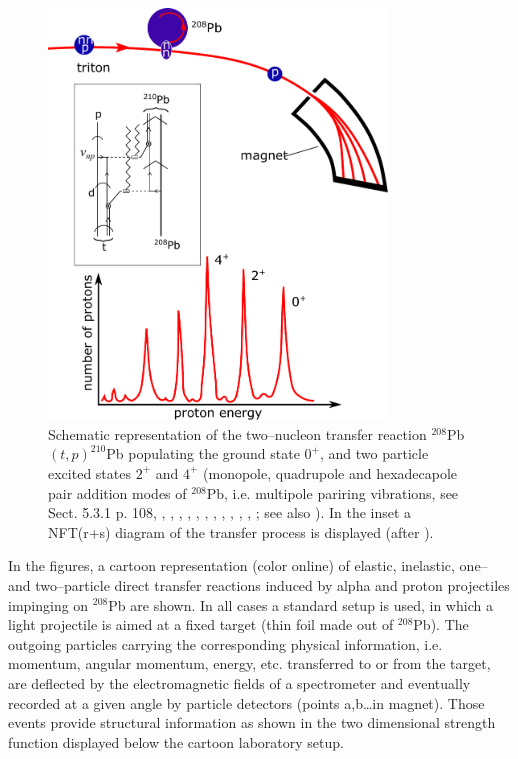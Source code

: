 \begin{figure}
\centerline {
\includegraphics*[width=9cm]{introduccion/figs/figintro3}
}
\caption{Schematic representation of the two--nucleon transfer reaction $^{208}$Pb$(t,p)^{210}$Pb populating the ground state $0^+$, and two particle excited states $2^+$ and $4^+$ (monopole, quadrupole and hexadecapole pair addition modes of $^{208}$Pb, i.e. multipole pariring vibrations, see \cite{Brink:05} Sect. 5.3.1 p. 108, \cite{Broglia:74}, \cite{Ragnarsson:76}, \cite{Broglia:71b}, \cite{Broglia:71c}, \cite{Bes:71d}, \cite{Bes:71}, \cite{Flynn:71}, \cite{Bes:72}, \cite{Broglia:81c}, \cite{Bohr:74b}, \cite{Flynn:72},  \cite{Bortignon:76}; see also \cite{Kubo:70}). In the inset a NFT(r+s) diagram of the transfer process is displayed (after \cite{Mottelson:76b}).}
\label{figintro3}
\end{figure}

In the figures, a cartoon representation (color online) of elastic, inelastic, one-- and two--particle direct transfer reactions induced by alpha and proton projectiles impinging on $^{208}$Pb are shown. In all cases a standard setup is used, in which a light projectile is aimed at a fixed target (thin foil made out of $^{208}$Pb). The outgoing particles carrying the corresponding physical information, i.e. momentum, angular momentum, energy, etc. transferred to or from the target, are deflected by the electromagnetic fields of a spectrometer and eventually recorded at a given angle by particle detectors (points a,b\dots in magnet). Those events provide structural information as shown in the two dimensional strength function displayed below the cartoon laboratory setup. 

